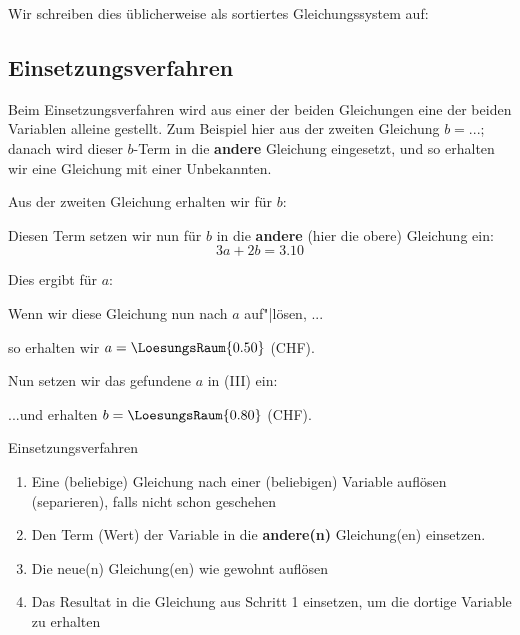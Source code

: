 Wir schreiben dies üblicherweise als sortiertes Gleichungssystem auf:



\subsection{Einsetzungsverfahren}\label{einsetzungsverfahren}
Beim Einsetzungsverfahren wird aus einer der beiden Gleichungen eine der beiden Variablen alleine gestellt. Zum Beispiel hier aus der zweiten Gleichung $b = ...$; danach wird dieser $b$-Term in die \textbf{andere} Gleichung eingesetzt, und so erhalten wir eine Gleichung mit einer Unbekannten.


Aus der zweiten Gleichung erhalten wir für $b$:


Diesen Term setzen wir nun für $b$ in die \textbf{andere} (hier die obere) Gleichung ein:
$$3a+2b = 3.10$$

Dies ergibt für $a$:


Wenn wir diese Gleichung nun nach $a$ auf"|lösen, ...


so erhalten wir $a = \LoesungsRaum{0.50}$ (CHF).


Nun setzen wir das gefundene $a$ in (III) ein:


...und erhalten $b = \LoesungsRaum{0.80}$ (CHF).


\newpage
\begin{rezept}{Einsetzungsverfahren}{}
  \begin{enumerate}

  \item Eine (beliebige) Gleichung nach einer (beliebigen) Variable
    auf\/lösen (separieren), falls nicht schon geschehen
  \item Den Term (Wert) der Variable in die \textbf{andere(n)}
    Gleichung(en) einsetzen.
  \item Die neue(n) Gleichung(en) wie gewohnt auf\/lösen
  \item Das Resultat in die Gleichung aus Schritt 1 einsetzen,
    um die dortige Variable zu erhalten
  \end{enumerate}
\end{rezept}


